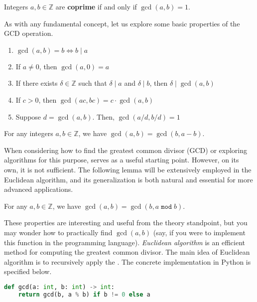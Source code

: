 \documentclass[../lecture-notes-148x210.tex]{subfiles}
\begin{document}
\begin{definition}
    Integers $a, b \in \mathbb{Z}$ are \textbf{coprime} if and only if $\gcd(a, b) = 1$.
\end{definition}

As with any fundamental concept, let us explore some basic properties of the GCD operation.

\begin{lemma} 
    \hfil
    \begin{enumerate}
        \item $\gcd(a, b) = b \iff b \mid a$
        \item If $a \neq 0$, then $\gcd(a, 0) = a$
        \item If there exists $\delta \in \mathbb{Z}$ such that $\delta \mid a$ and $\delta \mid b$, then $\delta \mid \gcd(a, b)$
        \item If $c > 0$, then $\gcd(ac, bc) = c \cdot \gcd(a, b)$
        \item Suppose $d = \gcd(a, b)$. Then, $\gcd(a/d, b/d) = 1$
    \end{enumerate}
\end{lemma}

\begin{lemma} \label{lemma:gcd_basic_calculation}
    For any integers $a,b \in \mathbb{Z}$, we have $\gcd(a, b) = \gcd(b, a - b)$. 
\end{lemma}

When considering how to find the greatest common divisor (GCD) or exploring algorithms 
for this purpose,  serves as a useful starting point. 
However, on its own, it is not sufficient. The following lemma will be extensively employed
in the Euclidean algorithm, and its generalization is both natural and essential for more 
advanced applications.

\begin{corollary} \label{cor:euclidean}
    For any $a,b \in \mathbb{Z}$, we have 
    $\gcd(a,b) =\gcd(b, a \; \texttt{mod} \; b)$.
\end{corollary}

These properties are interesting and useful from the theory standpoint, but
you may wonder how to practically find $\gcd(a, b)$ (say, if you were to
implement this function in the programming language). \emph{Euclidean algorithm} is an
efficient method for computing the greatest common divisor. The main idea of 
Euclidean algorithm is to recursively apply the . The concrete implementation 
in Python is specified below. 
\begin{lstlisting}[language=Python, numbers=none]
def gcd(a: int, b: int) -> int:
    return gcd(b, a % b) if b != 0 else a
\end{lstlisting}
\end{document}
